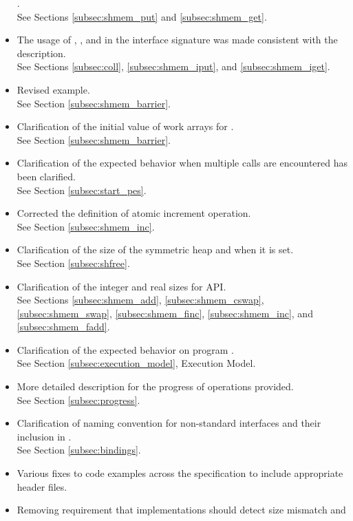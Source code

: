 \begin{itemize}
      .
\\See Sections \ref{subsec:shmem_put} and \ref{subsec:shmem_get}. 
%
\item The usage of , , and  in the
      interface signature was made consistent with the description.
\\See Sections \ref{subsec:coll}, \ref{subsec:shmem_iput}, and \ref{subsec:shmem_iget}.
%
\item Revised  example.
\\See Section \ref{subsec:shmem_barrier}. 
%
\item Clarification of the initial value of  work arrays for
.\\ See Section \ref{subsec:shmem_barrier}. 
%
\item Clarification of the expected behavior when multiple 
calls are encountered has been clarified.
\\See Section \ref{subsec:start_pes}.
%
\item Corrected the definition of atomic increment operation.
\\See Section \ref{subsec:shmem_inc}. 
%
\item Clarification of the size of the symmetric heap and when it is set.
\\See Section \ref{subsec:shfree}.
%
\item Clarification of the integer and real sizes for \Fortran \ac{API}.
\\See Sections \ref{subsec:shmem_add}, \ref{subsec:shmem_cswap},
      \ref{subsec:shmem_swap}, \ref{subsec:shmem_finc}, \ref{subsec:shmem_inc}, and
      \ref{subsec:shmem_fadd}. 
%
\item Clarification of the expected behavior on program .
\\See Section \ref{subsec:execution_model}, Execution Model. 
%
\item More detailed description for the progress of \openshmem operations
provided.
\\See Section \ref{subsec:progress}. 
%
\item Clarification of naming convention for non-standard interfaces and their
inclusion in .
\\See Section \ref{subsec:bindings}. 
%
\item Various fixes to \openshmem code examples across the specification to
include appropriate header files. 
%
\item Removing requirement that implementations should detect size mismatch and

\end{itemize}

